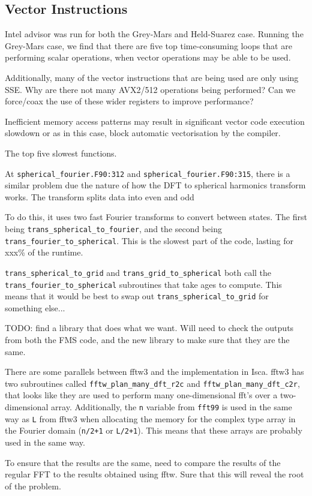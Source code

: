 \documentclass[a4paper,11pt]{report}
\begin{document}
\subsection{Vector Instructions}
Intel advisor was run for both the Grey-Mars and Held-Suarez case. Running the Grey-Mars case, we find that there are five top time-consuming loops that are performing scalar operations, when vector operations may be able to be used. 
\par
Additionally, many of the vector instructions that are being used are only using SSE. Why are there not many AVX2/512 operations being performed? Can we force/coax the use of these wider registers to improve performance? 
\par
Inefficient memory access patterns may result in significant vector code execution slowdown or as in this case, block automatic vectorisation by the compiler.
\par
The top five slowest functions.

\par
At \texttt{spherical\_fourier.F90:312} and \texttt{spherical\_fourier.F90:315}, there is a similar problem due the nature of how the DFT to spherical harmonics transform works. The transform splits data into even and odd 
\par
To do this, it uses two fast Fourier transforms to convert between states. The first being \texttt{trans\_spherical\_to\_fourier}, and the second being \texttt{trans\_fourier\_to\_spherical}. This is the slowest part of the code, lasting for xxx\% of the runtime. 

\texttt{trans\_spherical\_to\_grid} and \texttt{trans\_grid\_to\_spherical} both call the \texttt{trans\_fourier\_to\_spherical} subroutines that take ages to compute. This means that it would be best to swap out \texttt{trans\_spherical\_to\_grid} for something else... 
\par
TODO: find a library that does what we want. Will need to check the outputs from both the FMS code, and the new library to make sure that they are the same. 
\par
There are some parallels between fftw3 and the implementation in Isca. fftw3 has two subroutines called \texttt{fftw\_plan\_many\_dft\_r2c} and \texttt{fftw\_plan\_many\_dft\_c2r}, that looks like they are used to perform many one-dimensional fft's over a two-dimensional array. Additionally, the \texttt{n} variable from \texttt{fft99} is used in the same way as \texttt{L} from fftw3 when allocating the memory for the complex type array in the Fourier domain (\texttt{n/2+1} or \texttt{L/2+1}). This means that these arrays are probably used in the same way. 
\par
To ensure that the results are the same, need to compare the results of the regular FFT to the results obtained using fftw. Sure that this will reveal the root of the problem. 
\par
\end{document}
